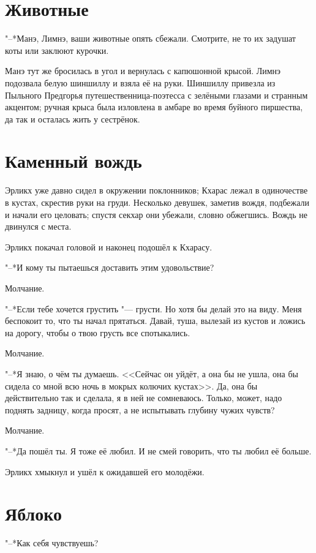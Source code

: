 \section{Животные}

"--*Манэ, Лимнэ, ваши животные опять сбежали.
Смотрите, не то их задушат коты или заклюют курочки.

Манэ тут же бросилась в угол и вернулась с капюшонной крысой.
Лимнэ подозвала белую шиншиллу и взяла её на руки.
Шиншиллу привезла из Пыльного Предгорья путешественница-поэтесса с зелёными глазами и странным акцентом;
ручная крыса была изловлена в амбаре во время буйного пиршества, да так и осталась жить у сестрёнок.

\section{Каменный вождь}

Эрликх уже давно сидел в окружении поклонников;
Кхарас лежал в одиночестве в кустах, скрестив руки на груди.
Несколько девушек, заметив вождя, подбежали и начали его целовать;
спустя секхар они убежали, словно обжегшись.
Вождь не двинулся с места.

Эрликх покачал головой и наконец подошёл к Кхарасу.

"--*И кому ты пытаешься доставить этим удовольствие?

Молчание.

"--*Если тебе хочется грустить "--- грусти.
Но хотя бы делай это на виду.
Меня беспокоит то, что ты начал прятаться.
Давай, туша, вылезай из кустов и ложись на дорогу, чтобы о твою грусть все спотыкались.

Молчание.

"--*Я знаю, о чём ты думаешь.
<<Сейчас он уйдёт, а она бы не ушла, она бы сидела со мной всю ночь в мокрых колючих кустах>>.
Да, она бы действительно так и сделала, я в ней не сомневаюсь.
Только, может, надо поднять задницу, когда просят, а не испытывать глубину чужих чувств?

Молчание.

"--*Да пошёл ты.
Я тоже её любил.
И не смей говорить, что ты любил её больше.

Эрликх хмыкнул и ушёл к ожидавшей его молодёжи.

\section{Яблоко}

"--*Как себя чувствуешь?

